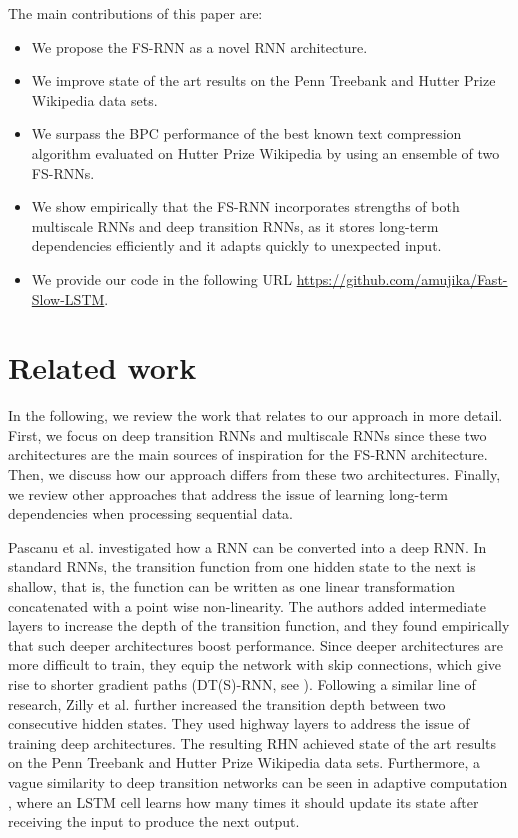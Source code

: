 \documentclass{article}
\begin{document}
The main contributions of this paper are:
\begin{itemize}
    \item We propose the FS-RNN as a novel RNN architecture.
    \item We improve state of the art results on the Penn Treebank and Hutter Prize Wikipedia data sets.
    \item We surpass the BPC performance of the best known text compression algorithm evaluated on Hutter Prize Wikipedia by using an ensemble of two FS-RNNs.
    \item We show empirically that the FS-RNN incorporates strengths of both multiscale RNNs and deep transition RNNs, as it stores long-term dependencies efficiently and it  adapts quickly to unexpected input.
    \item We provide our code in the following URL \url{https://github.com/amujika/Fast-Slow-LSTM}. 
\end{itemize} 






 
\section{Related work}\label{sec:RelatedWork} 



 In the following, we review the work that relates to our approach in more detail. First, we focus on deep transition RNNs and  multiscale RNNs since these two architectures are the main sources of inspiration for the FS-RNN architecture. Then, we discuss how our approach differs from these two architectures. Finally,  we review other approaches that address the issue of learning long-term dependencies when processing sequential data.


Pascanu et al. \cite{pascanu2013construct} investigated how a RNN can be converted into a deep RNN. In standard RNNs, the transition function from one hidden state to the next is shallow, that is, the function can be written as one linear transformation concatenated with a point wise non-linearity. The authors added intermediate layers to increase the depth of the transition function, and they found empirically that such deeper architectures boost performance. Since deeper architectures are more difficult to train, they equip the network with  skip connections, which give rise to shorter gradient paths (DT(S)-RNN, see \cite{pascanu2013construct}). Following a similar line of research, Zilly et al. \cite{zilly2016recurrent} further increased the transition depth between two consecutive hidden states.  They used highway layers \cite{srivastava2015highway} to address the issue of training  deep architectures. The resulting RHN \cite{zilly2016recurrent} achieved state of the art results on the Penn Treebank and Hutter Prize Wikipedia data sets. Furthermore, a vague similarity to deep transition networks can be seen in adaptive computation \cite{graves2016adaptive}, where an LSTM cell learns how many times it should update its state after receiving the input to produce the next output. 
\end{document}

